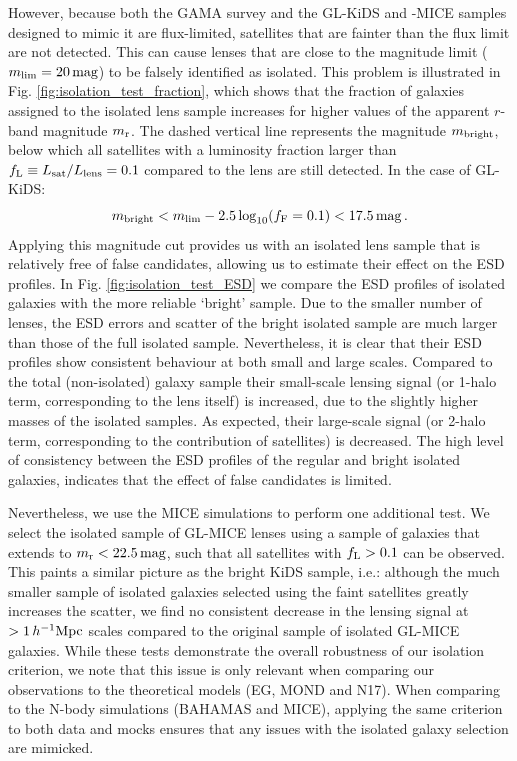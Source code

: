 \documentclass[usenatbib]{mnras}
\newcommand{\hMpc}{\, h^{-1}{\rm{Mpc}} }
\newcommand{\magn}{\, {\rm mag} }
\newcommand{\un}[1]{_{\rm #1}}
\begin{document}
However, because both the GAMA survey and the GL-KiDS and -MICE samples designed to mimic it are flux-limited, satellites that are fainter than the flux limit are not detected. This can cause lenses that are close to the magnitude limit ($m\un{lim}=20 \magn$) to be falsely identified as isolated. This problem is illustrated in Fig. \ref{fig:isolation_test_fraction}, which shows that the fraction of galaxies assigned to the isolated lens sample increases for higher values of the apparent $r$-band magnitude $m\un{r}$. The dashed vertical line represents the magnitude $m\un{bright}$, below which all satellites with a luminosity fraction larger than $f\un{L} \equiv L\un{sat}/L\un{lens}=0.1$ compared to the lens are still detected. In the case of GL-KiDS:
\begin{equation}
	m\un{bright} < m\un{lim} - 2.5 \log_{10}(f\un{F}=0.1) < 17.5 \magn \, .
\end{equation}
Applying this magnitude cut provides us with an isolated lens sample that is relatively free of false candidates, allowing us to estimate their effect on the ESD profiles. In Fig. \ref{fig:isolation_test_ESD} we compare the ESD profiles of isolated galaxies with the more reliable `bright' sample. Due to the smaller number of lenses, the ESD errors and scatter of the bright isolated sample are much larger than those of the full isolated sample. Nevertheless, it is clear that their ESD profiles show consistent behaviour at both small and large scales. Compared to the total (non-isolated) galaxy sample their small-scale lensing signal (or 1-halo term, corresponding to the lens itself) is increased, due to the slightly higher masses of the isolated samples. As expected, their large-scale signal (or 2-halo term, corresponding to the contribution of satellites) is decreased. The high level of consistency between the ESD profiles of the regular and bright isolated galaxies, indicates that the effect of false candidates is limited.

Nevertheless, we use the MICE simulations to perform one additional test. We select the isolated sample of GL-MICE lenses using a sample of galaxies that extends to $m\un{r}<22.5 \magn$, such that all satellites with $f\un{L}>0.1$ can be observed. This paints a similar picture as the bright KiDS sample, i.e.: although the much smaller sample of isolated galaxies selected using the faint satellites greatly increases the scatter, we find no consistent decrease in the lensing signal at $>1\hMpc$ scales compared to the original sample of isolated GL-MICE galaxies. While these tests demonstrate the overall robustness of our isolation criterion, we note that this issue is only relevant when comparing our observations to the theoretical models (EG, MOND and N17). When comparing to the N-body simulations (BAHAMAS and MICE), applying the same criterion to both data and mocks ensures that any issues with the isolated galaxy selection are mimicked.
\end{document}
